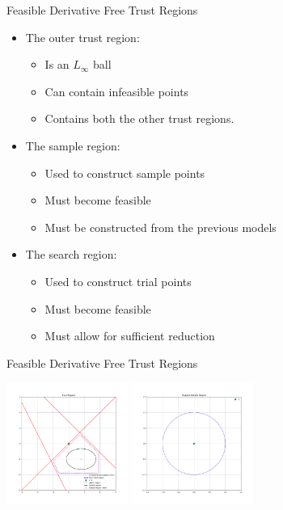 \documentclass{beamer}
\begin{document}
\begin{frame}{Feasible Derivative Free Trust Regions}
	\begin{itemize}
		\item The outer trust region:
			\begin{itemize}
				\item Is an $L_{\infty}$ ball
				\item Can contain infeasible points
				\item Contains both the other trust regions.
			\end{itemize}
		\item The sample region:
			\begin{itemize}
				\item Used to construct sample points
				\item Must become feasible
				\item Must be constructed from the previous models
			\end{itemize}
		\item The search region:
			\begin{itemize}
				\item Used to construct trial points
				\item Must become feasible
				\item Must allow for sufficient reduction
			\end{itemize}
	\end{itemize}
\end{frame}

\begin{frame}{Feasible Derivative Free Trust Regions}
	\begin{center}
		\includegraphics[width=150px]{images/all_regions_1.png}
		\includegraphics[width=150px]{images/all_regions_2.png}
	\end{center}
\end{frame}
\end{document}
